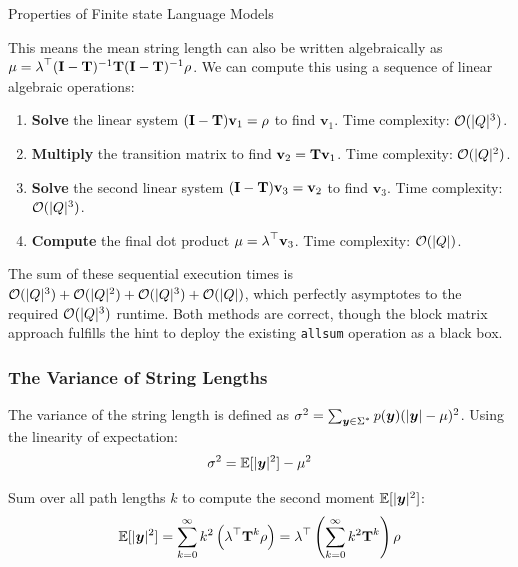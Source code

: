 \begin{question}{Properties of Finite state Language Models}
\begin{subquestion}
This means the mean string length can also be written algebraically as $\mu = \initf^\top (\mathbf{I} - \transMtx)^{-1} \transMtx (\mathbf{I} - \transMtx)^{-1} \finalf$. 
We can compute this using a sequence of linear algebraic operations:
\begin{enumerate}
    \item \textbf{Solve} the linear system $(\mathbf{I} - \transMtx) \mathbf{v}_1 = \finalf$ to find $\mathbf{v}_1$. Time complexity: $\bigo(|\states|^3)$.
    \item \textbf{Multiply} the transition matrix to find $\mathbf{v}_2 = \transMtx \mathbf{v}_1$. Time complexity: $\bigo(|\states|^2)$.
    \item \textbf{Solve} the second linear system $(\mathbf{I} - \transMtx) \mathbf{v}_3 = \mathbf{v}_2$ to find $\mathbf{v}_3$. Time complexity: $\bigo(|\states|^3)$.
    \item \textbf{Compute} the final dot product $\mu = \initf^\top \mathbf{v}_3$. Time complexity: $\bigo(|\states|)$.
\end{enumerate}

The sum of these sequential execution times is $\bigo(|\states|^3) + \bigo(|\states|^2) + \bigo(|\states|^3) + \bigo(|\states|)$, which perfectly asymptotes to the required $\bigo(|\states|^3)$ runtime. Both methods are correct, though the block matrix approach fulfills the hint to deploy the existing \texttt{allsum} operation as a black box.

\end{subquestion}

\begin{subquestion}

\subsubsection*{The Variance of String Lengths}

The variance of the string length is defined as $\sigma^2 = \sum_{\str \in \kleene{\alphabet}} \pLM(\str) (|\str| - \mu)^2$. Using the linearity of expectation:
\begin{equation}
    \sigma^2 = \expectation[|\str|^2] - \mu^2
\end{equation}

Sum over all path lengths $k$ to compute the second moment $\expectation[|\str|^2]$:
\begin{equation}
    \expectation[|\str|^2] = \sum_{k=0}^{\infty} k^2 \left(\initf^\top \transMtx^k \finalf\right) = \initf^\top \left( \sum_{k=0}^{\infty} k^2 \transMtx^k \right) \finalf
\end{equation}


\end{subquestion}
\end{question}
